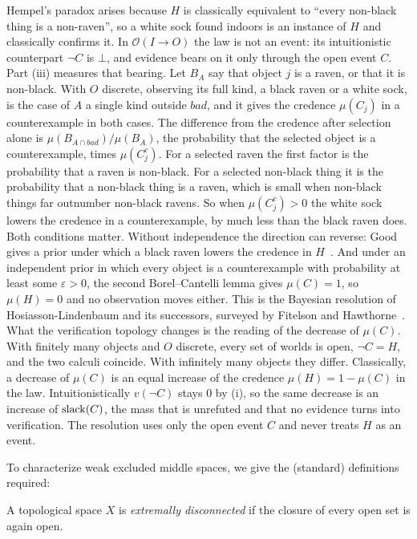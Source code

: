 Hempel's paradox arises because $H$ is classically equivalent to ``every
non-black thing is a non-raven'', so a white sock found indoors is an
instance of $H$ and classically confirms it. In $\mathcal{O}(I \to O)$
the law is not an event: its intuitionistic counterpart $\neg C$ is
$\bot$, and evidence bears on it only through the open event $C$. Part
(iii) measures that bearing. Let $B_A$ say that object $j$ is a raven,
or that it is non-black. With $O$ discrete, observing its full kind, a black raven or a
white sock, is the case of $A$ a single kind outside $\mathit{bad}$,
and it gives the credence $\mu(C_j)$ in a counterexample in both cases.
The difference from the credence after selection alone is
$\mu(B_{A \cap \mathit{bad}})/\mu(B_A)$, the probability that the
selected object is a counterexample, times $\mu(C_j^{c})$. For a
selected raven the first factor is the probability that a raven is
non-black. For a selected non-black thing it is the probability that a
non-black thing is a raven, which is small when non-black things far
outnumber non-black ravens. So when $\mu(C_j^{c}) > 0$ the white sock
lowers the credence in a counterexample, by much less than the black
raven does. Both conditions matter. Without independence the direction
can reverse: Good gives a prior under which a black raven lowers the
credence in $H$~\cite{good1967}. And under an independent prior in which
every object is a counterexample with probability at least some
$\varepsilon > 0$, the second Borel--Cantelli lemma gives $\mu(C) = 1$,
so $\mu(H) = 0$ and no observation moves either. This is the
Bayesian resolution of Hosiasson-Lindenbaum and its successors, surveyed
by Fitelson and Hawthorne~\cite{hosiasson1940,fitelson-hawthorne2010}.
What the verification topology changes is the reading of the decrease
of $\mu(C)$. With finitely many objects and $O$ discrete, every set of
worlds is open, $\neg C = H$, and the two calculi coincide. With
infinitely many objects they differ. Classically, a decrease of $\mu(C)$
is an equal increase of the credence $\mu(H) = 1 - \mu(C)$ in the law.
Intuitionistically $v(\neg C)$ stays $0$ by (i), so the same decrease is
an increase of $\mathrm{slack}(C)$, the mass that is unrefuted and that no
evidence turns into verification. The resolution uses only the open
event $C$ and never treats $H$ as an event.

To characterize weak excluded middle spaces, we give the 
(standard) definitions required: 

\begin{definition}
A topological space $X$ is \emph{extremally disconnected} if the
closure of every open set is again open.
\end{definition}

